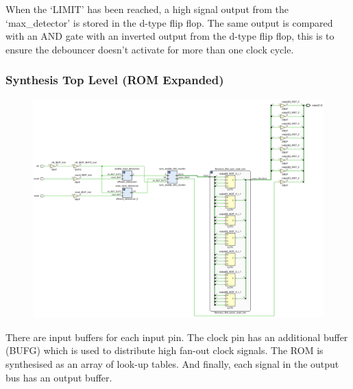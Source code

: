 \documentclass[11pt]{report}
\begin{document}
When the `LIMIT' has been reached, a high signal output from the `max\_detector' is stored in the d-type flip flop. The same output is compared with an AND gate with an inverted output from the d-type flip flop, this is to ensure the debouncer doesn't activate for more than one clock cycle.

\subsubsection*{Synthesis Top Level (ROM Expanded)}
\begin{figure}[H]
    \includegraphics[width=\columnwidth]{Schematics/03_synth-tl-rom-expanded.png}
\end{figure}
There are input buffers for each input pin. The clock pin has an additional buffer (BUFG) which is used to distribute high fan-out clock signals. The ROM is synthesised as an array of look-up tables. And finally, each signal in the output bus has an output buffer.
\end{document}
